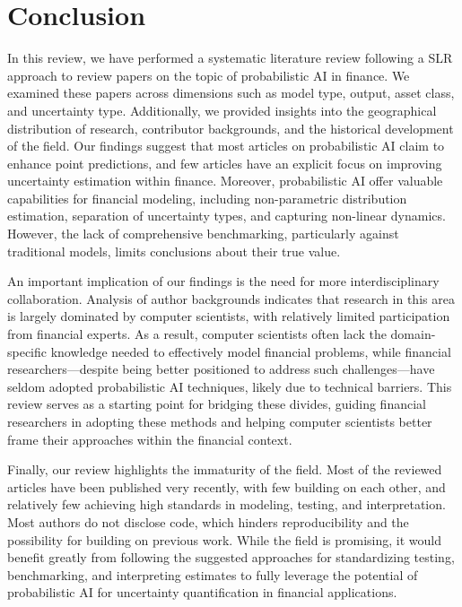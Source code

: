 \newpage
\section{Conclusion}
\label{sec:conclusion}
In this review, we have performed a systematic literature review following a SLR approach to review \samplesize papers on the topic of probabilistic AI in finance. We examined these papers across dimensions such as model type, output, asset class, and uncertainty type. Additionally, we provided insights into the geographical distribution of research, contributor backgrounds, and the historical development of the field. Our findings suggest that most articles on probabilistic AI claim to enhance point predictions, and few articles have an explicit focus on improving uncertainty estimation within finance. Moreover, probabilistic AI offer valuable capabilities for financial modeling, including non-parametric distribution estimation, separation of uncertainty types, and capturing non-linear dynamics. However, the lack of comprehensive benchmarking, particularly against traditional models, limits conclusions about their true value. 

An important implication of our findings is the need for more interdisciplinary collaboration. Analysis of author backgrounds indicates that research in this area is largely dominated by computer scientists, with relatively limited participation from financial experts. As a result, computer scientists often lack the domain-specific knowledge needed to effectively model financial problems, while financial researchers—despite being better positioned to address such challenges—have seldom adopted probabilistic AI techniques, likely due to technical barriers. This review serves as a starting point for bridging these divides, guiding financial researchers in adopting these methods and helping computer scientists better frame their approaches within the financial context.

Finally, our review highlights the immaturity of the field. Most of the reviewed articles have been published very recently, with few building on each other, and relatively few achieving high standards in modeling, testing, and interpretation. Most authors do not disclose code, which hinders reproducibility and the possibility for building on previous work. While the field is promising, it would benefit greatly from following the suggested approaches for standardizing testing, benchmarking, and interpreting estimates to fully leverage the potential of probabilistic AI for uncertainty quantification in financial applications.